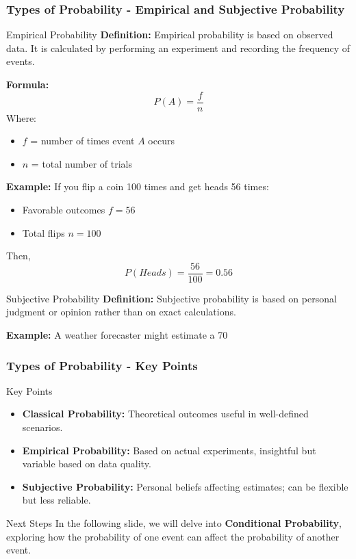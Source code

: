 \documentclass[aspectratio=169]{beamer}
\begin{document}
\begin{frame}[fragile]
    \frametitle{Types of Probability - Empirical and Subjective Probability}
    \begin{block}{Empirical Probability}
        \textbf{Definition:} Empirical probability is based on observed data. It is calculated by performing an experiment and recording the frequency of events.

        \textbf{Formula:}
        \begin{equation}
            P(A) = \frac{f}{n}
        \end{equation}
        Where:
        \begin{itemize}
            \item \( f \) = number of times event \( A \) occurs
            \item \( n \) = total number of trials
        \end{itemize}
        
        \textbf{Example:} If you flip a coin 100 times and get heads 56 times:
        \begin{itemize}
            \item Favorable outcomes \( f = 56 \)
            \item Total flips \( n = 100 \)
        \end{itemize}
        Then,
        \[
        P(Heads) = \frac{56}{100} = 0.56
        \]
    \end{block}


    \begin{block}{Subjective Probability}
        \textbf{Definition:} Subjective probability is based on personal judgment or opinion rather than on exact calculations. 

        \textbf{Example:} A weather forecaster might estimate a 70%
    \end{block}
\end{frame}

\begin{frame}[fragile]
    \frametitle{Types of Probability - Key Points}
    \begin{block}{Key Points}
        \begin{itemize}
            \item \textbf{Classical Probability:} Theoretical outcomes useful in well-defined scenarios.
            \item \textbf{Empirical Probability:} Based on actual experiments, insightful but variable based on data quality.
            \item \textbf{Subjective Probability:} Personal beliefs affecting estimates; can be flexible but less reliable.
        \end{itemize}
    \end{block}
    
    \begin{block}{Next Steps}
        In the following slide, we will delve into \textbf{Conditional Probability}, exploring how the probability of one event can affect the probability of another event.
    \end{block}
\end{frame}
\end{document}

